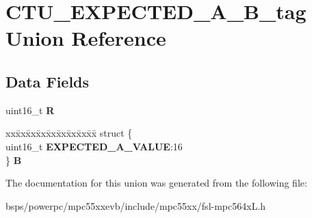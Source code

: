 \hypertarget{unionCTU__EXPECTED__A__16B__tag}{}\section{C\+T\+U\+\_\+\+E\+X\+P\+E\+C\+T\+E\+D\+\_\+\+A\+\_\+B\+\_\+tag Union Reference}
\label{unionCTU__EXPECTED__A__16B__tag}
\subsection*{Data Fields}
\begin{DoxyCompactItemize}
\item 
\mbox{\label{unionCTU__EXPECTED__A__16B__tag_a3be984f390bca676998816b5fb892cf4}} 
uint16\+\_\+t {\bfseries R}
\item 
\mbox{\label{unionCTU__EXPECTED__A__16B__tag_a3f2ac72cc31aee4ae9d6ac50fb489f47}} 
\begin{tabbing}
xx\=xx\=xx\=xx\=xx\=xx\=xx\=xx\=xx\=\kill
struct \{\\
\>uint16\_t {\bfseries EXPECTED\_A\_VALUE}:16\\
\} {\bfseries B}\\

\end{tabbing}\end{DoxyCompactItemize}


The documentation for this union was generated from the following file\+:\begin{DoxyCompactItemize}
\item 
bsps/powerpc/mpc55xxevb/include/mpc55xx/fsl-\/mpc564x\+L.\+h\end{DoxyCompactItemize}
